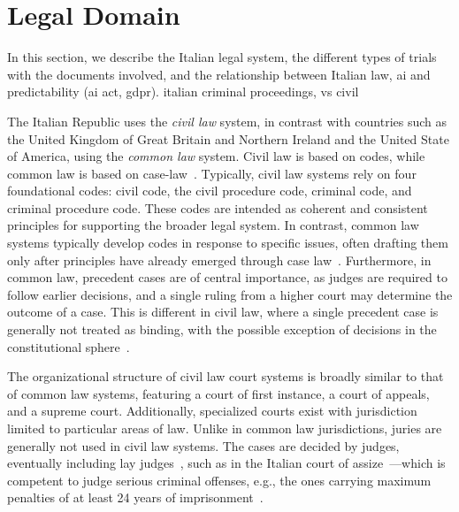 \section{Legal Domain}
\label{sec:domains}
In this section, we describe the Italian legal system, the different types of trials with the documents involved, and the relationship between Italian law, \acl{ai} and predictability (ai act, gdpr).
italian criminal proceedings, vs civil

The Italian Republic uses the \emph{civil law} system, in contrast with countries such as the United Kingdom of Great Britain and Northern Ireland and the United State of America, using the \emph{common law} system. Civil law is based on codes, while common law is based on case-law~\cite{Carlson2009}. Typically, civil law systems rely on four foundational codes: civil code, the civil procedure code, criminal code, and criminal procedure code.  These codes are intended as coherent and consistent principles for supporting the broader legal system. In contrast, common law systems typically develop codes in response to specific issues, often drafting them only after principles have already emerged through case law~\cite{Carlson2009}.
Furthermore, in common law, precedent cases are of central importance, as judges are required to follow earlier decisions, and a single ruling from a higher court may determine the outcome of a case. This is different in civil law, where a single precedent case is generally not treated as binding, with the possible exception of decisions in the constitutional sphere~\cite{Carlson2009}. 

The organizational structure of civil law court systems is broadly similar to that of common law systems, featuring a court of first instance, a court of appeals, and a supreme court. Additionally, specialized courts exist with jurisdiction limited to particular areas of law. Unlike in common law jurisdictions, juries are generally not used in civil law systems. The cases are decided by judges, eventually including lay judges~\cite{Carlson2009}, such as in the Italian court of assize~\cite[Article 3]{legge10apr1951}---which is competent to judge serious criminal offenses, e.g., the ones carrying maximum penalties of at least 24 years of imprisonment~\cite[Article 5]{CPP}.  

